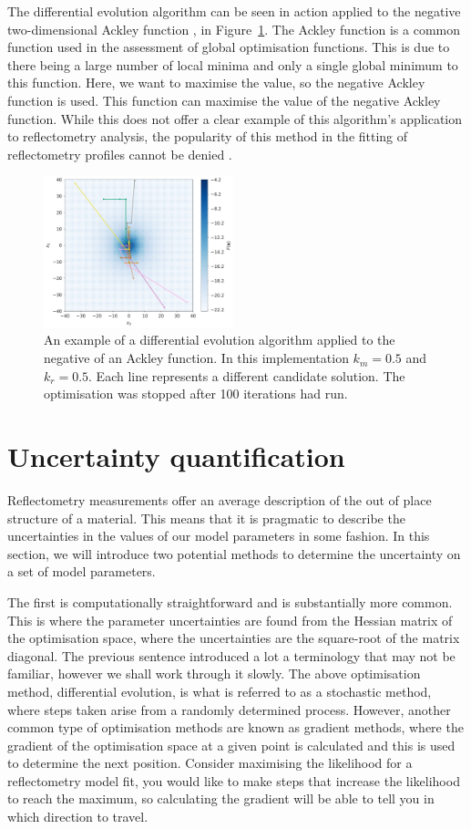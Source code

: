 \documentclass[
 reprint,
 superscriptaddress,
 amsmath,amssymb,
 aps,
]{revtex4-1}
\begin{document}
The differential evolution algorithm can be seen in action applied to the negative two-dimensional Ackley function \cite{ackley_connectionist_1987}, in Figure~\ref{fig:ackley}.
The Ackley function is a common function used in the assessment of global optimisation functions. This is due to there being a large number of local minima and only a single global minimum to this function. Here, we want to maximise the value, so the negative Ackley function is used.
This function can maximise the value of the negative Ackley function.
While this does not offer a clear example of this algorithm's application to reflectometry analysis, the popularity of this method in the fitting of reflectometry profiles cannot be denied \cite{bjorck_fitting_2011,nelson_refnx_2019}.
%
\begin{figure}[t]
    \includegraphics[width=0.49\textwidth]{ackley}
    \caption{An example of a differential evolution algorithm applied to the negative of an Ackley function. In this implementation $k_m=0.5$ and $k_r=0.5$. Each line represents a different candidate solution. The optimisation was stopped after 100 iterations had run.}
    \label{fig:ackley}
\end{figure}
%

\section{Uncertainty quantification}
Reflectometry measurements offer an average description of the out of place structure of a material. 
This means that it is pragmatic to describe the uncertainties in the values of our model parameters in some fashion.
In this section, we will introduce two potential methods to determine the uncertainty on a set of model parameters. 

The first is computationally straightforward and is substantially more common. 
This is where the parameter uncertainties are found from the Hessian matrix of the optimisation space, where the uncertainties are the square-root of the matrix diagonal. 
The previous sentence introduced a lot a terminology that may not be familiar, however we shall work through it slowly. 
The above optimisation method, differential evolution, is what is referred to as a stochastic method, where steps taken arise from a randomly determined process. 
However, another common type of optimisation methods are known as gradient methods, where the gradient of the optimisation space at a given point is calculated and this is used to determine the next position. 
Consider maximising the likelihood for a reflectometry model fit, you would like to make steps that increase the likelihood to reach the maximum, so calculating the gradient will be able to tell you in which direction to travel. 
\end{document}
